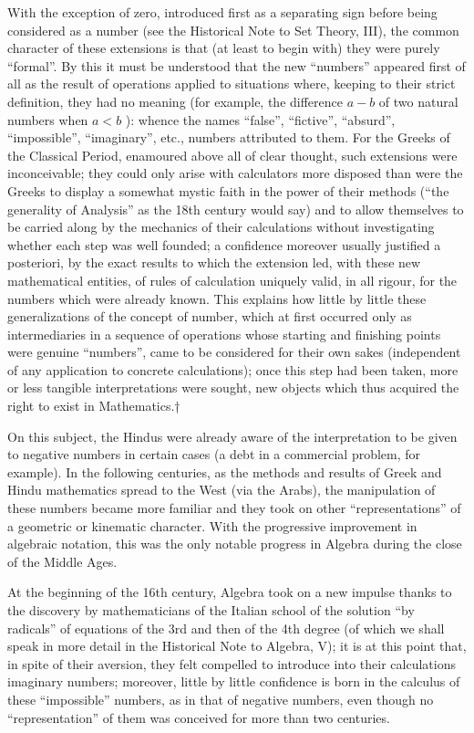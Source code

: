With the exception of zero, introduced first as a separating sign before being considered as a number (see the Historical Note to Set Theory, III), the common character of these extensions is that (at least to begin with) they were purely ``formal''. By this it must be understood that the new ``numbers'' appeared first of all as the result of operations applied to situations where, keeping to their strict definition, they had no meaning (for example, the difference \(a - b\) of two natural numbers when \(a < b\) ): whence the names ``false'', ``fictive'', ``absurd'', ``impossible'', ``imaginary'', etc., numbers attributed to them. For the Greeks of the Classical Period, enamoured above all of clear thought, such extensions were inconceivable; they could only arise with calculators more disposed than were the Greeks to display a somewhat mystic faith in the power of their methods (``the generality of Analysis'' as the 18th century would say) and to allow themselves to be carried along by the mechanics of their calculations without investigating whether each step was well founded; a confidence moreover usually justified a posteriori, by the exact results to which the extension led, with these new mathematical entities, of rules of calculation uniquely valid, in all rigour, for the numbers which were already known. This explains how little by little these generalizations of the concept of number, which at first occurred only as intermediaries in a sequence of operations whose starting and finishing points were genuine ``numbers'', came to be considered for their own sakes (independent of any application to concrete calculations); once this step had been taken, more or less tangible interpretations were sought, new objects which thus acquired the right to exist in Mathematics.†

On this subject, the Hindus were already aware of the interpretation to be given to negative numbers in certain cases (a debt in a commercial problem, for example). In the following centuries, as the methods and results of Greek and Hindu mathematics spread to the West (via the Arabs), the manipulation of these numbers became more familiar and they took on other ``representations'' of a geometric or kinematic character. With the progressive improvement in algebraic notation, this was the only notable progress in Algebra during the close of the Middle Ages.

At the beginning of the 16th century, Algebra took on a new impulse thanks to the discovery by mathematicians of the Italian school of the solution ``by radicals'' of equations of the 3rd and then of the 4th degree (of which we shall speak in more detail in the Historical Note to Algebra, V); it is at this point that, in spite of their aversion, they felt compelled to introduce into their calculations imaginary numbers; moreover, little by little confidence is born in the calculus of these ``impossible'' numbers, as in that of negative numbers, even though no ``representation'' of them was conceived for more than two centuries.

